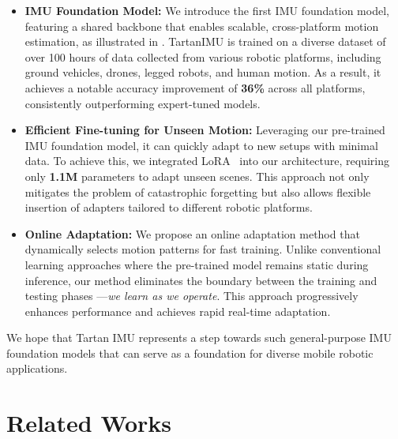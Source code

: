 \begin{itemize}    
    \item \textbf{IMU Foundation Model:} We introduce the first IMU foundation model, featuring a shared backbone that enables scalable, cross-platform motion estimation, as illustrated in . TartanIMU is trained on a diverse dataset of over 100 hours of data collected from various robotic platforms, including ground vehicles, drones, legged robots, and human motion. As a result, it achieves a notable accuracy improvement of \textbf{36\%} across all platforms, consistently outperforming expert-tuned models.   
    

    \item \textbf{Efficient Fine-tuning for Unseen Motion:} Leveraging our pre-trained IMU foundation model, it can quickly adapt to new setups with minimal data. To achieve this, we integrated LoRA~\cite{hu2021lora} into our architecture, requiring only \textbf{1.1M} parameters to adapt unseen scenes. This approach not only mitigates the problem of catastrophic forgetting but also allows flexible insertion of adapters tailored to different robotic platforms.
       
  \item \textbf{Online Adaptation:} We propose an online adaptation method that dynamically selects motion patterns for fast training. Unlike conventional learning approaches where the pre-trained model remains static during inference, our method eliminates the boundary between the training and testing phases —\textit{we learn as we operate}. This approach progressively enhances performance and achieves rapid real-time adaptation. 

  
    
\end{itemize}

We hope that Tartan IMU represents a step towards such general-purpose IMU foundation models that can serve as a foundation for diverse mobile robotic applications.


\section{Related Works}
\label{chapter7:related_works}


